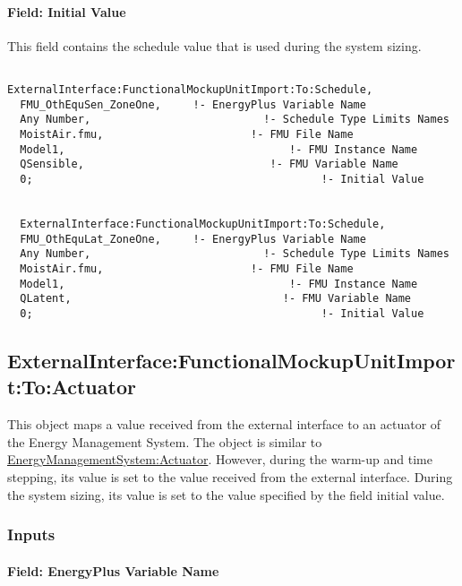 \paragraph{Field: Initial Value}\label{field-initial-value-3}

This field contains the schedule value that is used during the system sizing.

\begin{lstlisting}

ExternalInterface:FunctionalMockupUnitImport:To:Schedule,
  FMU_OthEquSen_ZoneOne,     !- EnergyPlus Variable Name
  Any Number,                           !- Schedule Type Limits Names
  MoistAir.fmu,                       !- FMU File Name
  Model1,                                   !- FMU Instance Name
  QSensible,                             !- FMU Variable Name
  0;                                             !- Initial Value


  ExternalInterface:FunctionalMockupUnitImport:To:Schedule,
  FMU_OthEquLat_ZoneOne,     !- EnergyPlus Variable Name
  Any Number,                           !- Schedule Type Limits Names
  MoistAir.fmu,                       !- FMU File Name
  Model1,                                   !- FMU Instance Name
  QLatent,                                 !- FMU Variable Name
  0;                                             !- Initial Value
\end{lstlisting}

\subsection{ExternalInterface:FunctionalMockupUnitImport:To:Actuator}\label{externalinterfacefunctionalmockupunitimporttoactuator}

This object maps a value received from the external interface to an actuator of the Energy Management System. The object is similar to \hyperref[energymanagementsystemactuator]{EnergyManagementSystem:Actuator}. However, during the warm-up and time stepping, its value is set to the value received from the external interface. During the system sizing, its value is set to the value specified by the field initial value.

\subsubsection{Inputs}\label{inputs-7-009}

\paragraph{Field: EnergyPlus Variable Name}\label{field-energyplus-variable-name-2}

